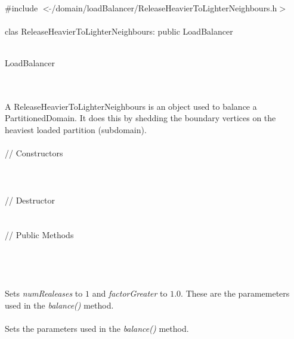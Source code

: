 
   \\
\indent \#include $<\tilde{
}$/domain/loadBalancer/ReleaseHeavierToLighterNeighbours.h$>$  \\ 

  \\
clas ReleaseHeavierToLighterNeighbours: public LoadBalancer 


 \\
 LoadBalancer 

\indent{} \\


  \\
\indent A ReleaseHeavierToLighterNeighbours is an object used to balance a
PartitionedDomain. It does this by shedding the boundary vertices on
the heaviest loaded partition (subdomain). \\

  \\
\indent\indent  // Constructors  \\
\indent{}\\ 
\indent{} \\ \\ 
\indent\indent // Destructor  \\
\indent{}\\\\
\indent\indent // Public Methods  \\
\indent{} \\ \\


\\
\\ 
Sets {\em numRealeases} to $1$ and {\em factorGreater} to $1.0$. These
are the paramemeters used in the {\em balance()} method. \\

 \\ 
Sets the parameters used in the {\em balance()} method. \\

